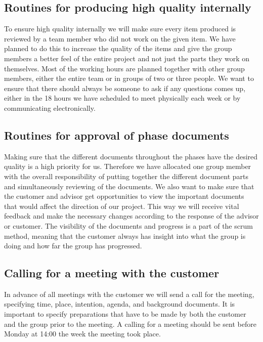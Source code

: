 \subsection{Routines for producing high quality internally}
To ensure high quality internally we will make sure every item produced is reviewed by a team member who did not work on the given item. We have planned to do this to increase the quality of the items and give the group members a better feel of the entire project and not just the parts they work on themselves.
\newline
\newline
Most of the working hours are planned together with other group members, either the entire team or in groups of two or three people. We want to ensure that there should always be someone to ask if any questions comes up, either in the 18 hours we have scheduled to meet physically each week or by communicating electronically. 

\newpage

\subsection{Routines for approval of phase documents}
Making sure that the different documents throughout the phases have the desired quality is a high priority for us. Therefore we have allocated one group member with the overall responsibility of putting together the different document parts and simultaneously reviewing of the documents. 
\newline
\newline 
We also want to make sure that the customer and advisor get opportunities to view the important documents that would affect the direction of our project. This way we will receive vital feedback and make the necessary changes according to the response of the advisor or customer. 
\newline
\newline
The visibility of the documents and progress is a part of the scrum method, meaning that the customer always has insight into what the group is doing and how far the group has progressed.

\subsection{Calling for a meeting with the customer}
In advance of all meetings with the customer we will send a call for the meeting, specifying time, place, intention, agenda, and background documents. It is important to specify preparations that have to be made by both the customer and the group prior to the meeting.
\newline
\newline
A calling for a meeting should be sent before Monday at 14:00 the week the meeting took place.


